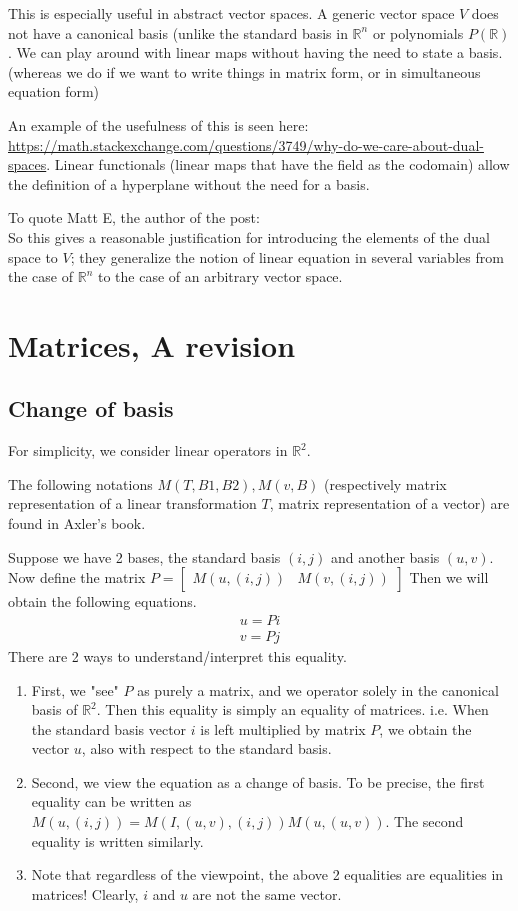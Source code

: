 \documentclass{article}
\begin{document}
This is especially useful in abstract vector spaces. A generic vector space $V$ does not have a canonical basis (unlike the standard basis in $\mathbb{R}^n$ or polynomials $P(\mathbb{R})$. We can play around with linear maps without having the need to state a basis. (whereas we do if we want to write things in matrix form, or in simultaneous equation form)

An example of the usefulness of this is seen here: \url{https://math.stackexchange.com/questions/3749/why-do-we-care-about-dual-spaces}.
Linear functionals (linear maps that have the field as the codomain) allow the definition of a hyperplane without the need for a basis.

To quote Matt E, the author of the post:\\
So this gives a reasonable justification for introducing the elements of the dual space to $V$; they generalize the notion of linear equation in several variables from the case of $\mathbb{R}^n$ to the case of an arbitrary vector space.


\section{Matrices, A revision}
\subsection{Change of basis}
For simplicity, we consider linear operators in $\mathbb{R}^2$.

The following notations $M(T, B1, B2), M(v, B)$ (respectively matrix representation of a linear transformation $T$, matrix representation of a vector) are found in Axler's book.

Suppose we have 2 bases, the standard basis $(i, j)$ and another basis $(u,v)$. Now define the matrix $P=
\begin{bmatrix}
	M(u, (i,j)) & M(v, (i,j))
\end{bmatrix}
$
Then we will obtain the following equations.
\begin{align*}
	u=Pi\\
	v=Pj
\end{align*}
There are 2 ways to understand/interpret this equality.
\begin{enumerate}
	\item First, we "see" $P$ as purely a matrix, and we operator solely in the canonical basis of $\mathbb{R}^2$. Then this equality is simply an equality of matrices. i.e. When the standard basis vector $i$ is left multiplied by matrix $P$, we obtain the vector $u$, also with respect to the standard basis.
	\item Second, we view the equation as a change of basis. To be precise, the first equality can be written as $M(u, (i,j))=M(I, (u,v), (i,j))M(u, (u,v))$. The second equality is written similarly.
	\item Note that regardless of the viewpoint, the above 2 equalities are equalities in matrices! Clearly, $i$ and $u$ are not the same vector.
\end{enumerate}
\end{document}
